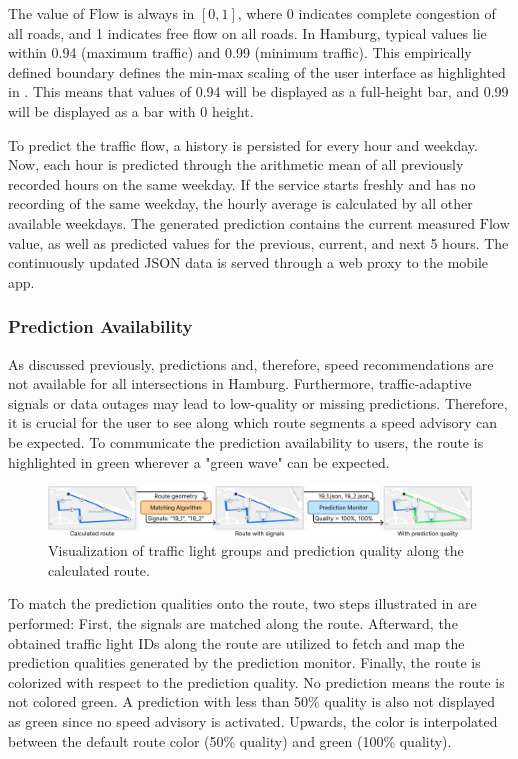 The value of $\text{Flow}$ is always in $[0, 1]$, where 0 indicates complete congestion of all roads, and 1 indicates free flow on all roads. In Hamburg, typical values lie within 0.94 (maximum traffic) and 0.99 (minimum traffic). This empirically defined boundary defines the min-max scaling of the user interface as highlighted in . This means that values of 0.94 will be displayed as a full-height bar, and 0.99 will be displayed as a bar with 0 height. 

To predict the traffic flow, a history is persisted for every hour and weekday. Now, each hour is predicted through the arithmetic mean of all previously recorded hours on the same weekday. If the service starts freshly and has no recording of the same weekday, the hourly average is calculated by all other available weekdays. The generated prediction contains the current measured $\text{Flow}$ value, as well as predicted values for the previous, current, and next 5 hours. The continuously updated JSON data is served through a web proxy to the mobile app.

\subsubsection{Prediction Availability}

As discussed previously, predictions and, therefore, speed recommendations are not available for all intersections in Hamburg. Furthermore, traffic-adaptive signals or data outages may lead to low-quality or missing predictions. Therefore, it is crucial for the user to see along which route segments a speed advisory can be expected. To communicate the prediction availability to users, the route is highlighted in green wherever a "green wave" can be expected.

\begin{figure}[htbp]
\centering
\includegraphics[width=\linewidth]{images/routing-process-quality-mapping.png}
\caption{Visualization of traffic light groups and prediction quality along the calculated route.}
\label{fig:routing-process-quality-mapping}
\end{figure}

To match the prediction qualities onto the route, two steps illustrated in  are performed: First, the signals are matched along the route. Afterward, the obtained traffic light IDs along the route are utilized to fetch and map the prediction qualities generated by the prediction monitor. Finally, the route is colorized with respect to the prediction quality. No prediction means the route is not colored green. A prediction with less than 50\% quality is also not displayed as green since no speed advisory is activated. Upwards, the color is interpolated between the default route color (50\% quality) and green (100\% quality). 


